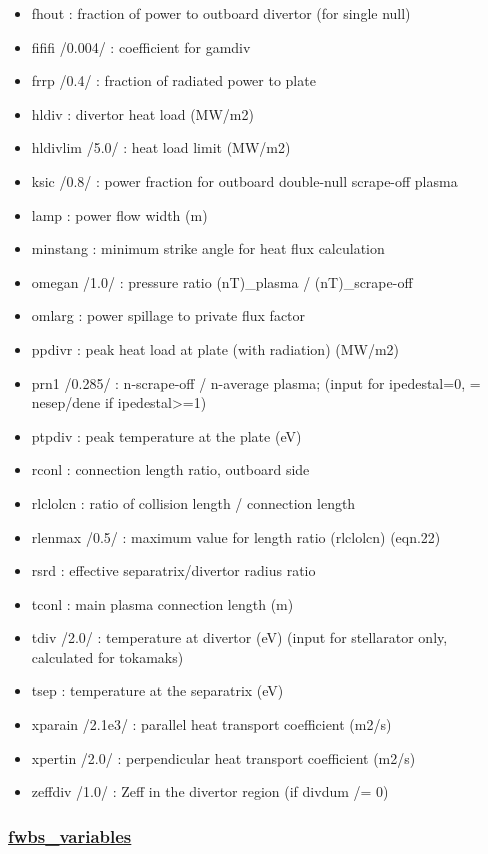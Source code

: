 \documentclass[]{article}
\begin{document}
\begin{itemize}
\item
  fhout : fraction of power to outboard divertor (for single null)
\item
  fififi /0.004/ : coefficient for gamdiv
\item
  frrp /0.4/ : fraction of radiated power to plate
\item
  hldiv : divertor heat load (MW/m2)
\item
  hldivlim /5.0/ : heat load limit (MW/m2)
\item
  ksic /0.8/ : power fraction for outboard double-null scrape-off plasma
\item
  lamp : power flow width (m)
\item
  minstang : minimum strike angle for heat flux calculation
\item
  omegan /1.0/ : pressure ratio (nT)\_plasma / (nT)\_scrape-off
\item
  omlarg : power spillage to private flux factor
\item
  ppdivr : peak heat load at plate (with radiation) (MW/m2)
\item
  prn1 /0.285/ : n-scrape-off / n-average plasma; (input for
  ipedestal=0, = nesep/dene if ipedestal\textgreater{}=1)
\item
  ptpdiv : peak temperature at the plate (eV)
\item
  rconl : connection length ratio, outboard side
\item
  rlclolcn : ratio of collision length / connection length
\item
  rlenmax /0.5/ : maximum value for length ratio (rlclolcn) (eqn.22)
\item
  rsrd : effective separatrix/divertor radius ratio
\item
  tconl : main plasma connection length (m)
\item
  tdiv /2.0/ : temperature at divertor (eV) (input for stellarator only,
  calculated for tokamaks)
\item
  tsep : temperature at the separatrix (eV)
\item
  xparain /2.1e3/ : parallel heat transport coefficient (m2/s)
\item
  xpertin /2.0/ : perpendicular heat transport coefficient (m2/s)
\item
  zeffdiv /1.0/ : Zeff in the divertor region (if divdum /= 0)
\end{itemize}

\subsubsection{\href{fwbs_variables.html}{fwbs\_variables}}
\end{document}
